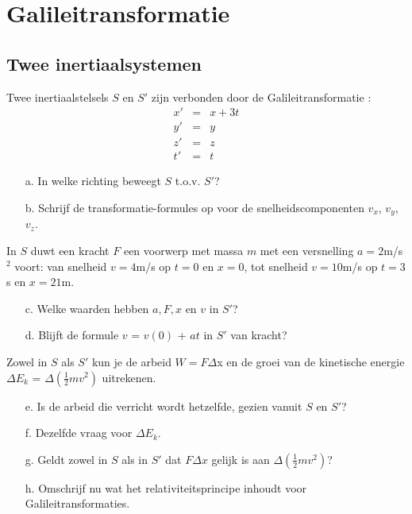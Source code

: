 \section{Galileitransformatie}
\subsection{Twee inertiaalsystemen}
Twee inertiaalstelsels $S$ en $S'$ zijn verbonden door de 
Galileitransformatie :
\begin{eqnarray*}
x' & = & x + 3t \\ 
y' & = & y \\
z' & = & z \\
t' & = & t 
\end{eqnarray*}
\begin{itemize}
\item [a.] In welke richting beweegt $S$ t.o.v. $S'$?
\item [b.] Schrijf de transformatie-formules op voor de 
snelheidscomponenten
$v_{x}$, $v_{y}$, $v_{z}$.
\end{itemize}
In $S$ duwt een kracht $F$ een voorwerp met massa $m$ 
met een versnelling 
$a = 2 $m/s$^{2}$ voort: van snelheid $v = 4$m/s op 
$t = 0$ en $x = 0$, tot snelheid
$v = 10$m/s op $t = 3$s en $x = 21 $m.
\begin{itemize}
\item [c.]
Welke waarden hebben $a, F, x$ en $v $ in $S'$?
\item [d.]
Blijft de formule $v$ = $v(0)$ + $at$ in $S'$ van kracht?
\end{itemize}
Zowel in $S$ als $S'$ kun je de arbeid $W = F\Delta$x en de groei van de 
kinetische energie $\Delta E_{k}$ = $\Delta (\frac{1}{2}mv^{2})$ uitrekenen.
\begin{itemize}
\item [e.]
Is de arbeid die verricht wordt hetzelfde, gezien vanuit $S$ en $S'$?
\item [f.]
Dezelfde vraag voor $\Delta E_{k}$.
\item [g.]
Geldt zowel in $S$ als in $S'$ dat $F\Delta x$ gelijk is aan 
$\Delta (\frac{1}{2}mv^{2})$?
\item [h.]
Omschrijf nu wat het relativiteitsprincipe inhoudt voor 
Galileitransformaties.
\end{itemize}


